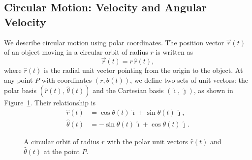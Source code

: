 \subsection{Circular Motion: Velocity and Angular Velocity}

We describe circular motion using polar coordinates. The position vector $\vec{r}(t)$ of an object moving in a circular orbit of radius $r$ is written as
\begin{equation}
    \vec{r}(t) = r\,\hat{r}(t),
\end{equation}
where $\hat{r}(t)$ is the radial unit vector pointing from the origin to the object. At any point $P$ with coordinates $(r, \theta(t))$, we define two sets of unit vectors: the polar basis $(\hat{r}(t),\, \hat{\theta}(t))$ and the Cartesian basis $(\hat{\imath},\, \hat{\jmath})$, as shown in Figure~\ref{fig:circleunitvec}. Their relationship is
\begin{align}
    \hat{r}(t)      &= \cos\theta(t)\,\hat{\imath} + \sin\theta(t)\,\hat{\jmath}, \label{eq:rhat}\\
    \hat{\theta}(t) &= -\sin\theta(t)\,\hat{\imath} + \cos\theta(t)\,\hat{\jmath}. \label{eq:thetahat}
\end{align}

\begin{figure}[ht]
\centering
{}
\caption{A circular orbit of radius $r$ with the polar unit vectors $\hat{r}(t)$ and $\hat{\theta}(t)$ at the point $P$.}
\label{fig:circleunitvec}
\end{figure}

